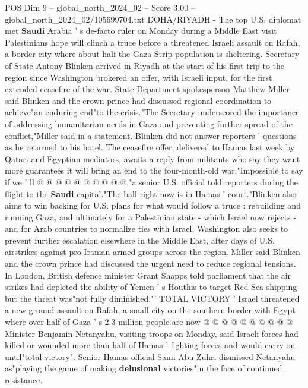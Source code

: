 \begin{textsample}{POS Dim 9 – global\_north\_2024\_02 – Score 3.00 – global\_north\_2024\_02/105699704.txt}  \label{ex:f9_pos_156}
DOHA/RIYADH - The top U.S. diplomat met \textbf{Saudi} Arabia ' s de-facto ruler on Monday during a Middle East visit Palestinians hope will clinch a truce before a threatened Israeli assault on Rafah, a border city where about half the Gaza Strip population is sheltering.
Secretary of State Antony Blinken arrived in Riyadh at the start of his first trip to the region since Washington brokered an offer, with Israeli input, for the first extended ceasefire of the war.
State Department spokesperson Matthew Miller said Blinken and the crown prince had discussed regional coordination to achieve"an enduring end"to the crisis."The Secretary underscored the importance of addressing humanitarian needs in Gaza and preventing further spread of the conflict,"Miller said in a statement.
Blinken did not answer reporters ' questions as he returned to his hotel.
The ceasefire offer, delivered to Hamas last week by Qatari and Egyptian mediators, awaits a reply from militants who say they want more guarantees it will bring an end to the four-month-old war."Impossible to say if we ' ll @ @ @ @ @ @ @ @ @ @,"a senior U.S. official told reporters during the flight to the \textbf{Saudi} capital."The ball right now is in Hamas ' court."Blinken also aims to win backing for U.S. plans for what would follow a truce : rebuilding and running Gaza, and ultimately for a Palestinian state - which Israel now rejects - and for Arab countries to normalize ties with Israel.
Washington also seeks to prevent further escalation elsewhere in the Middle East, after days of U.S. airstrikes against pro-Iranian armed groups across the region.
Miller said Blinken and the crown prince had discussed the urgent need to reduce regional tensions.
In London, British defence minister Grant Shapps told parliament that the air strikes had depleted the ability of Yemen ' s Houthis to target Red Sea shipping but the threat was"not fully diminished."' TOTAL VICTORY ' Israel threatened a new ground assault on Rafah, a small city on the southern border with Egypt where over half of Gaza ' s 2.3 million people are now @ @ @ @ @ @ @ @ @ @ Minister Benjamin Netanyahu, visiting troops on Monday, said Israeli forces had killed or wounded more than half of Hamas ' fighting forces and would carry on until"total victory".
Senior Hamas official Sami Abu Zuhri dismissed Netanyahu as"playing the game of making \textbf{delusional} victories"in the face of continued resistance.

\end{textsample}
